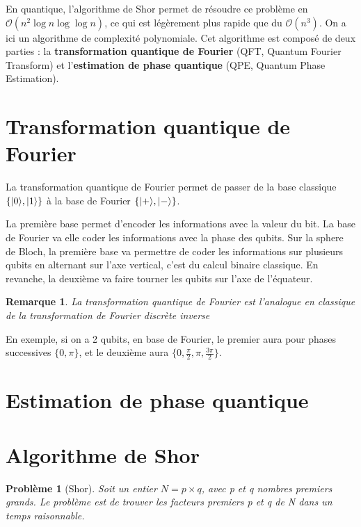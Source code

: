 \documentclass[12pt,a4paper]{article}
\DeclarePairedDelimiter\ket{\lvert}{\rangle}
\newtheorem{pb}{Problème}
\newtheorem{rem}{Remarque}
\begin{document}
En quantique, l'algorithme de Shor permet de résoudre ce problème en $\mathcal{O}(n^2 \log n \log \log n)$, ce qui est légèrement plus rapide que du $\mathcal{O}(n^3)$. On a ici un algorithme de complexité polynomiale. Cet algorithme est composé de deux parties : la \textbf{transformation quantique de Fourier} (QFT, Quantum Fourier Transform) et l'\textbf{estimation de phase quantique} (QPE, Quantum Phase Estimation).

\section{Transformation quantique de Fourier}

La transformation quantique de Fourier permet de passer de la base classique $\{\ket{0}, \ket{1}\}$ à la base de Fourier $\{\ket{+}, \ket{-}\}$.

La première base permet d'encoder les informations avec la valeur du bit. La base de Fourier va elle coder les informations avec la phase des qubits. Sur la sphere de Bloch, la première base va permettre de coder les informations sur plusieurs qubits en alternant sur l'axe vertical, c'est du calcul binaire classique. En revanche, la deuxième va faire tourner les qubits sur l'axe de l'équateur.

\begin{rem}
  La transformation quantique de Fourier est l'analogue en classique de la transformation de Fourier discrète inverse
\end{rem}

En exemple, si on a 2 qubits, en base de Fourier, le premier aura pour phases successives $\{0, \pi\}$, et le deuxième aura $\{0, \frac{\pi}{2}, \pi, \frac{3\pi}{2}\}$.

\section{Estimation de phase quantique}
\section{Algorithme de Shor}
\begin{pb}[Shor]
Soit un entier $N = p \times q$, avec p et q nombres premiers grands. Le problème est de trouver les facteurs premiers p et q de N dans un temps raisonnable.
\end{pb}

\begin{algorithm}[H]
  \SetAlgoLined
\end{algorithm}
\end{document}
